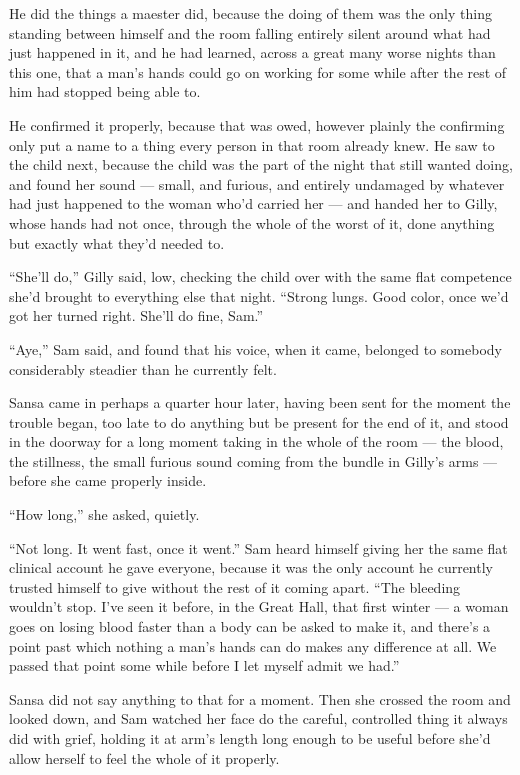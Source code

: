 He did the things a maester did, because the doing of them was the only thing standing between himself and the room falling entirely silent around what had just happened in it, and he had learned, across a great many worse nights than this one, that a man’s hands could go on working for some while after the rest of him had stopped being able to.

He confirmed it properly, because that was owed, however plainly the confirming only put a name to a thing every person in that room already knew. He saw to the child next, because the child was the part of the night that still wanted doing, and found her sound — small, and furious, and entirely undamaged by whatever had just happened to the woman who’d carried her — and handed her to Gilly, whose hands had not once, through the whole of the worst of it, done anything but exactly what they’d needed to.

“She’ll do,” Gilly said, low, checking the child over with the same flat competence she’d brought to everything else that night. “Strong lungs. Good color, once we’d got her turned right. She’ll do fine, Sam.”

“Aye,” Sam said, and found that his voice, when it came, belonged to somebody considerably steadier than he currently felt.

\sceneBreak

Sansa came in perhaps a quarter hour later, having been sent for the moment the trouble began, too late to do anything but be present for the end of it, and stood in the doorway for a long moment taking in the whole of the room — the blood, the stillness, the small furious sound coming from the bundle in Gilly’s arms — before she came properly inside.

“How long,” she asked, quietly.

“Not long. It went fast, once it went.” Sam heard himself giving her the same flat clinical account he gave everyone, because it was the only account he currently trusted himself to give without the rest of it coming apart. “The bleeding wouldn’t stop. I’ve seen it before, in the Great Hall, that first winter — a woman goes on losing blood faster than a body can be asked to make it, and there’s a point past which nothing a man’s hands can do makes any difference at all. We passed that point some while before I let myself admit we had.”

Sansa did not say anything to that for a moment. Then she crossed the room and looked down, and Sam watched her face do the careful, controlled thing it always did with grief, holding it at arm’s length long enough to be useful before she’d allow herself to feel the whole of it properly.

